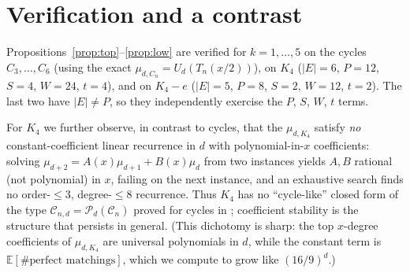 \documentclass[11pt]{article}
\theoremstyle{remark}
\newcommand{\E}{\mathbb{E}}
\begin{document}
\section{Verification and a contrast}

Propositions~\ref{prop:top}--\ref{prop:low} are verified for
$k=1,\dots,5$ on the cycles $C_3,\dots,C_6$ (using the exact
$\mu_{d,C_n}=U_d(T_n(x/2))$), on $K_4$ ($|E|=6$, $P=12$, $S=4$, $W=24$,
$t=4$), and on $K_4-e$ ($|E|=5$, $P=8$, $S=2$, $W=12$, $t=2$). The last two
have $|E|\ne P$, so they independently exercise the $P$, $S$, $W$, $t$ terms.

For $K_4$ we further observe, in contrast to cycles, that the $\mu_{d,K_4}$
satisfy \emph{no} constant-coefficient linear recurrence in $d$ with
polynomial-in-$x$ coefficients: solving
$\mu_{d+2}=A(x)\mu_{d+1}+B(x)\mu_d$ from two instances yields $A,B$ rational
(not polynomial) in $x$, failing on the next instance, and an exhaustive
search finds no order-$\le 3$, degree-$\le 8$ recurrence. Thus $K_4$ has no
``cycle-like'' closed form of the type $\mathcal C_{n,d}=\mathcal
P_d(\mathcal C_n)$ proved for cycles in \cite{CGHRS}; coefficient stability is
the structure that persists in general. (This dichotomy is sharp: the top
$x$-degree coefficients of $\mu_{d,K_4}$ are universal polynomials in $d$,
while the constant term is $\E[\#\text{perfect matchings}]$, which we compute to
grow like $(16/9)^d$.)
\end{document}
